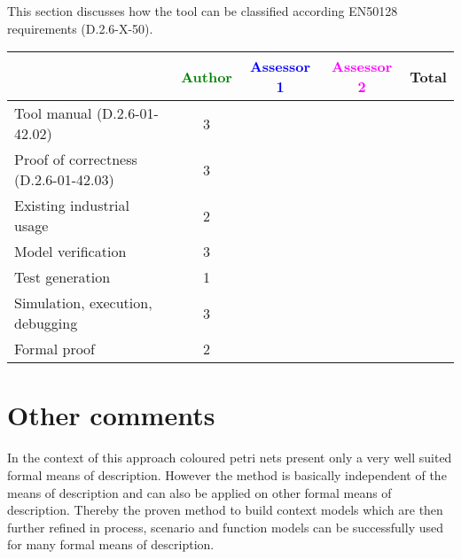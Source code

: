This section discusses how the tool can be classified according EN50128 requirements (D.2.6-X-50).


\begin{tabular}{|l | c | c | c | c|}
\hline
& \textcolor{green}{Author} & \textcolor{blue}{Assessor 1} & \textcolor{magenta}{Assessor 2} & Total \\
\hline 
Tool manual (D.2.6-01-42.02) & 3 & & &  \\
\hline
Proof of correctness (D.2.6-01-42.03)   & 3  & & & \\
\hline
Existing industrial  usage  & 2 & & & \\
\hline
Model verification & 3 & & & \\
\hline
Test generation & 1 & & & \\
\hline
Simulation, execution, debugging & 3 & & & \\
\hline
Formal proof & 2 & & & \\
\hline
\end{tabular}

\begin{comment}
\paragraph{Other elements for tool certification}
Open issue.
\end{comment}

\section{Other comments}
In the context of this approach coloured petri nets present only a very well suited formal means of description. However the method is basically independent of the means of description and can also be applied on other formal means of description. Thereby the proven method to build context models which are then further refined in process, scenario and function models can be successfully used for many formal means of description. 



